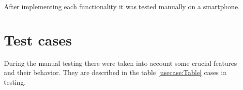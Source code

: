 \documentclass[a4paper,twoside,12pt]{book}
\begin{document}
\par After implementing each functionality it was tested manually on a smartphone.

\section{Test cases}

\par During the manual testing there were taken into account some crucial features and their behavior. They are described in the table \ref{usecase:Table} cases in testing.

\end{document}
